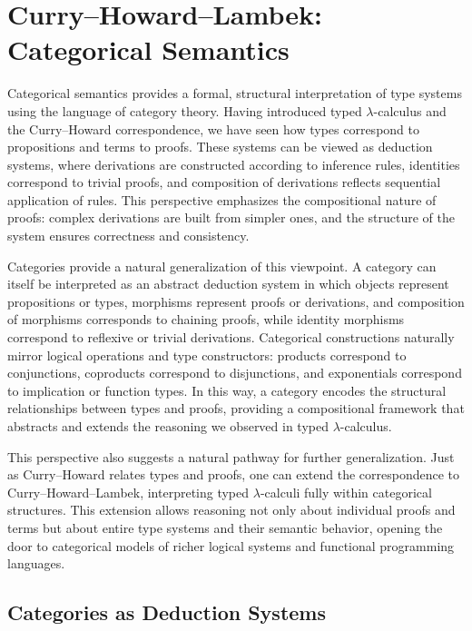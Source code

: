 
\chapter{Curry--Howard--Lambek: Categorical Semantics}


Categorical semantics provides a formal, structural interpretation of type systems using the language of category theory. Having introduced typed $\lambda$-calculus and the Curry--Howard correspondence, we have seen how types correspond to propositions and terms to proofs. These systems can be viewed as deduction systems, where derivations are constructed according to inference rules, identities correspond to trivial proofs, and composition of derivations reflects sequential application of rules. This perspective emphasizes the compositional nature of proofs: complex derivations are built from simpler ones, and the structure of the system ensures correctness and consistency.

Categories provide a natural generalization of this viewpoint. A category can itself be interpreted as an abstract deduction system in which objects represent propositions or types, morphisms represent proofs or derivations, and composition of morphisms corresponds to chaining proofs, while identity morphisms correspond to reflexive or trivial derivations. Categorical constructions naturally mirror logical operations and type constructors: products correspond to conjunctions, coproducts correspond to disjunctions, and exponentials correspond to implication or function types. In this way, a category encodes the structural relationships between types and proofs, providing a compositional framework that abstracts and extends the reasoning we observed in typed $\lambda$-calculus.

This perspective also suggests a natural pathway for further generalization. Just as Curry--Howard relates types and proofs, one can extend the correspondence to Curry--Howard--Lambek, interpreting typed $\lambda$-calculi fully within categorical structures. This extension allows reasoning not only about individual proofs and terms but about entire type systems and their semantic behavior, opening the door to categorical models of richer logical systems and functional programming languages.

\section{\centering Categories as Deduction Systems}

